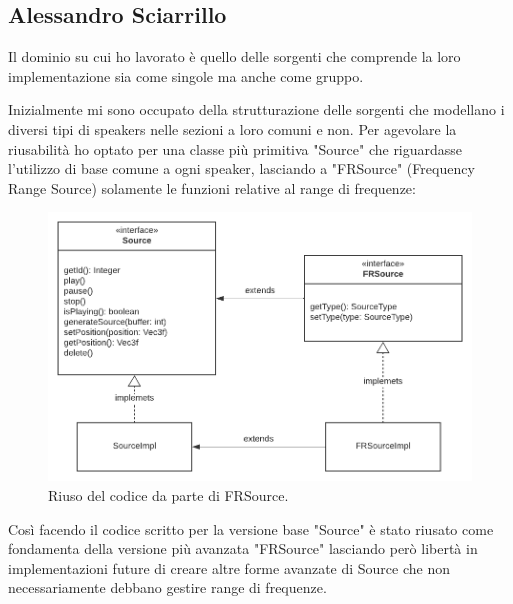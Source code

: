 \documentclass[a4paper,12pt]{report}
\begin{document}
\subsection*{Alessandro Sciarrillo}
Il dominio su cui ho lavorato è quello delle sorgenti che comprende la loro implementazione sia come singole ma anche come gruppo.

Inizialmente mi sono occupato della strutturazione delle sorgenti che modellano i diversi tipi di speakers nelle sezioni a loro comuni e non. Per agevolare la riusabilità ho optato per una classe più primitiva "Source" che riguardasse l'utilizzo di base comune a ogni speaker, lasciando a "FRSource" (Frequency Range Source) solamente le funzioni relative al range di frequenze:
%
\begin{figure}[H]
\centering{}
\includegraphics[width=\textwidth]{img/source/Source-FRSource.png}
\caption{Riuso del codice da parte di FRSource.}
\label{img:sourcesAndFRSource}
\end{figure}

Così facendo il codice scritto per la versione base "Source" è stato riusato come fondamenta della versione più avanzata "FRSource"
lasciando però libertà in implementazioni future di creare altre forme avanzate di Source che non necessariamente debbano gestire
range di frequenze.
\end{document}
